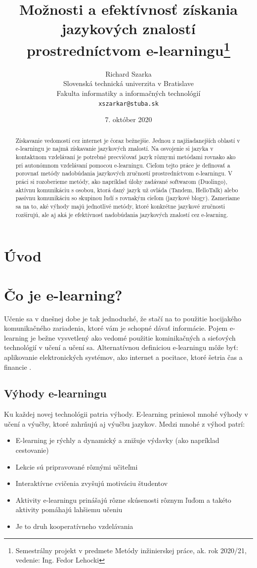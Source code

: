 \documentclass[10pt,oneside,slovak,a4paper]{article}
\title{Možnosti a efektívnosť získania jazykových znalostí prostredníctvom
e-learningu\thanks{Semestrálny projekt v predmete Metódy inžinierskej práce, ak. rok 2020/21, vedenie: Ing. Fedor Lehocki }} %
\author{Richard Szarka\\[2pt]
	{\small Slovenská technická univerzita v Bratislave}\\
	{\small Fakulta informatiky a informačných technológií}\\
	{\small \texttt{xszarkar@stuba.sk}}
	}
\date{\small 7. október 2020} %
\begin{document}
\maketitle

\begin{abstract}
Získavanie vedomostí cez internet je čoraz bežnejšie. Jednou z najžiadanejších oblastí v e-learningu je najmä získavanie jazykových znalostí. Na osvojenie si jazyka v kontaktnom vzdelávaní je potrebné precvičovať jazyk rôznymi metódami rovnako ako pri autonómnom vzdelávaní pomocou e-learningu. Cieľom tejto práce je definovať a porovnať metódy nadobúdania jazykových zručností prostredníctvom e-learningu. V práci si rozoberieme metódy, ako napríklad úlohy zadávané softwarom (Duolingo), aktívnu komunikáciu s osobou, ktorá daný jazyk už ovláda (Tandem, HelloTalk) alebo pasívnu komunikáciu so skupinou ľudí s rovnakým cieľom (jazykové blogy). Zameriame sa na to, aké výhody majú jednotlivé metódy, ktoré konkrétne jazykové zručnosti rozširujú, ale aj aká je efektívnosť nadobúdania jazykových znalostí cez e-learning.
\end{abstract}

\section{Úvod} %

\section{Čo je e-learning?}%
Učenie sa v dnešnej dobe je tak jednoduché, že stačí na to použitie hocijakého komunikačného zariadenia, ktoré vám je schopné dávať informácie\cite{vyhody}. Pojem e-learning je bežne vysvetlený ako vedomé použitie kominikačných a sieťových technológií v učení a učení sa. Alternatívnou definiciou e-learningu môže byť: aplikovanie elektronických systémov, ako internet a pocitace, ktoré šetria čas a financie \cite{efektivnost}. 

\subsection{Výhody e-learningu}%
Ku každej novej technológii patria výhody. E-learning priniesol mnohé výhody v učení a výučby, ktoré zahrňujú aj výučbu jazykov. Medzi mnohé z výhod patrí:
\begin{itemize}
\item E-learning je rýchly a dynamický a znižuje výdavky (ako napríklad cestovanie) \cite{efektivnost}
\item Lekcie sú pripravované rôznými učiteľmi \cite{efektivnost}
\item Interaktívne cvičenia zvyšujú motiváciu študentov \cite{vyhody}
\item Aktivity e-learningu prinášajú rôzne skúsenosti rôznym ľuďom a takéto aktivity pomáhajú lahšiemu učeniu \cite{vyhody}
\item Je to druh kooperatívneho vzdelávania \cite{efektivnost}
\end{itemize}
\end{document}
